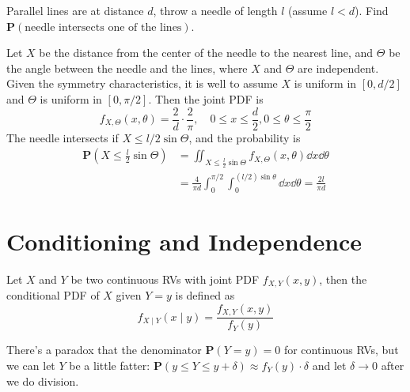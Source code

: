 \documentclass[device=normal, lang=en]{elegantbook}
\numberwithin{equation}{section}
\begin{document}
\begin{example}
    Parallel lines are at distance $d$, throw a needle of length $l$ (assume $l < d$). Find $\mathbf{P}(\text{needle intersects one of the lines})$.  
    \begin{solution}
        Let $X$ be the distance from the center of the needle to the nearest line, and $\Theta$ be the angle between the needle and the lines, where $X$ and $\Theta$ are independent. Given the symmetry characteristics, it is well to assume $X$ is uniform in $[0, d/2]$ and $\Theta$ is uniform in $[0, \pi/2]$. Then the joint PDF is
    \begin{equation}
        f_{X, \Theta}(x, \theta) = \frac{2}{d} \cdot \frac{2}{\pi}, \quad 0 \leq x \leq \frac{d}{2}, 0 \leq \theta \leq \frac{\pi}{2}
    \end{equation}
    The needle intersects if $X \leq l/2 \sin\Theta$, and the probability is
    \begin{equation}
    \begin{aligned}
        \mathbf{P}(X \leq \frac{l}{2}\sin\Theta) &= \iint_{X\leq\frac{l}{2}\sin\Theta} f_{X, \Theta}(x, \theta) \dd{x} \dd{\theta} \\ 
        &= \frac{4}{\pi d} \int_{0}^{\pi/2} \int_{0}^{(l/2)\sin\theta} \dd{x} \dd{\theta} = \frac{2l}{\pi d}
    \end{aligned}
    \end{equation}
    \end{solution}
\end{example}


\section{Conditioning and Independence}

\begin{definition}
    Let $X$ and $Y$ be two continuous RVs with joint PDF $f_{X, Y}(x, y)$, then the conditional PDF of $X$ given $Y = y$ is defined as
    \begin{equation}
        f_{X \mid Y}(x \mid y) = \frac{f_{X, Y}(x, y)}{f_{Y}(y)}
    \end{equation}
\end{definition}

\begin{remark}
    There's a paradox that the denominator $\mathbf{P}(Y = y) = 0$ for continuous RVs, but we can let $Y$ be a little fatter: $\mathbf{P}(y \leq Y \leq y + \delta) \approx f_{Y}(y) \cdot \delta$ and let $\delta \to 0$ after we do division.
\end{remark}
\end{document}
